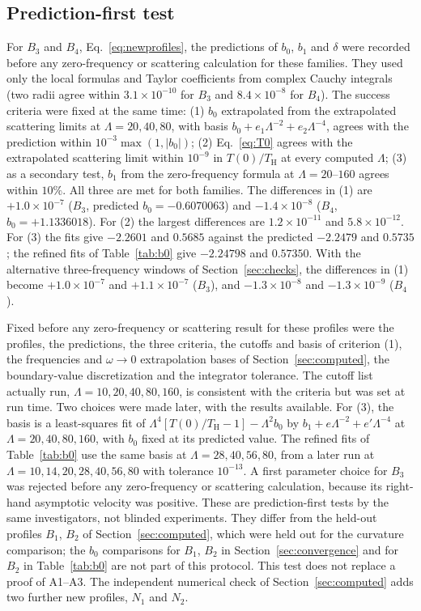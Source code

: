 \documentclass[10pt,a4paper]{article}
\newcommand{\HawkingT}{T_{\mathrm H}}
\begin{document}
\subsection{Prediction-first test}
\label{sec:blind}
For $B_3$ and $B_4$, Eq.~\eqref{eq:newprofiles}, the predictions of $b_0$,
$b_1$ and $\delta$ were recorded before any zero-frequency or scattering
calculation for these families. They used only the local formulas and
Taylor coefficients from complex Cauchy integrals (two radii agree within
$3.1\times10^{-10}$ for $B_3$ and $8.4\times10^{-8}$ for $B_4$). The success criteria were fixed at the same
time: (1) $b_0$ extrapolated from the extrapolated scattering limits at
$\Lambda=20,40,80$, with basis $b_0+e_1\Lambda^{-2}+e_2\Lambda^{-4}$,
agrees with the prediction within $10^{-3}\max(1,|b_0|)$;
(2) Eq.~\eqref{eq:T0} agrees with the extrapolated scattering limit within $10^{-9}$ in $T(0)/\HawkingT$ at every computed $\Lambda$;
(3) as a secondary test, $b_1$ from the zero-frequency formula at
$\Lambda=20$--$160$ agrees within $10\%$. All three are met for both
families. The differences in (1) are $+1.0\times10^{-7}$ ($B_3$,
predicted $b_0=-0.6070063$) and $-1.4\times10^{-8}$ ($B_4$,
$b_0=+1.1336018$). For (2) the largest differences are
$1.2\times10^{-11}$ and $5.8\times10^{-12}$. For (3) the fits give
$-2.2601$ and $0.5685$ against the predicted $-2.2479$ and $0.5735$;
the refined fits of Table~\ref{tab:b0} give $-2.24798$ and $0.57350$.
With the alternative three-frequency windows of Section~\ref{sec:checks},
the differences in (1) become $+1.0\times10^{-7}$ and $+1.1\times10^{-7}$
($B_3$), and $-1.3\times10^{-8}$ and $-1.3\times10^{-9}$ ($B_4$).

Fixed before any zero-frequency or scattering result for these profiles
were the profiles, the predictions, the three criteria, the cutoffs and
basis of criterion (1), the frequencies and $\omega\to0$ extrapolation
bases of Section~\ref{sec:computed}, the boundary-value discretization and
the integrator tolerance. The cutoff list actually run,
$\Lambda=10,20,40,80,160$, is consistent with the criteria but was set at
run time. Two choices were made later, with the results available. For
(3), the basis is a least-squares fit of
$\Lambda^4[T(0)/\HawkingT-1]-\Lambda^2b_0$ by
$b_1+e\Lambda^{-2}+e'\Lambda^{-4}$ at $\Lambda=20,40,80,160$, with $b_0$
fixed at its predicted value. The refined fits of Table~\ref{tab:b0} use the
same basis at $\Lambda=28,40,56,80$, from a later run at
$\Lambda=10,14,20,28,40,56,80$ with tolerance $10^{-13}$. A first parameter
choice for $B_3$ was rejected before any zero-frequency or scattering
calculation, because its right-hand asymptotic velocity was positive. These
are prediction-first tests by the same investigators, not blinded
experiments. They differ from the held-out profiles $B_1$, $B_2$ of
Section~\ref{sec:computed}, which were held out for the curvature
comparison; the $b_0$ comparisons for $B_1$, $B_2$ in Section~\ref{sec:convergence}
and for $B_2$ in Table~\ref{tab:b0} are not part of this protocol. This test does not
replace a proof of A1--A3. The independent numerical check of
Section~\ref{sec:computed} adds two further new profiles, $N_1$ and $N_2$.
\end{document}

